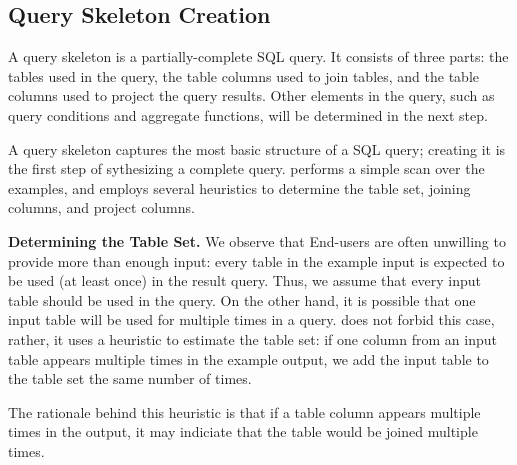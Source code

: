 \subsection{Query Skeleton Creation}
\label{sec:skeleton}



A query skeleton is a partially-complete SQL query.
It consists of three parts: the tables used in
the query, the table columns used to join tables, and the table
columns used to project the query results.
Other elements in the query, such as query conditions
and aggregate functions, will be determined in
the next step.

A query skeleton captures the most basic structure of
a SQL query; creating it is the first step of sythesizing
a complete query. \ourtool performs a simple scan over
the examples, and employs several heuristics to determine
the table set, joining columns, and project columns.


\vspace{1mm}
{\textbf{Determining the Table Set.}} 
We observe that End-users are often unwilling to provide more than enough
input: every table in the example input
is expected to be used (at least once) in the result query.
Thus, we assume that every input table
should be used in the query. 
On the other hand, it is possible that one input table will be
used for multiple times in a query.
\ourtool does not forbid this case,
rather, it uses a heuristic
to estimate the table set: if one column from
an input table appears multiple times in the
example output, we add the input table to the table set the same
number of times.

The rationale behind this heuristic is that if a table column
appears multiple times in the output, it may indiciate that the
table would be joined multiple times.



